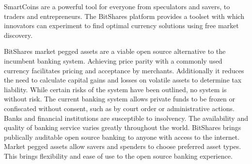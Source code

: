 
SmartCoins are a powerful tool for everyone from speculators and savers, to
traders and entrepreneurs. The BitShares platform provides a toolset with which
innovators can experiment to find optimal currency solutions using free market
discovery.

BitShares market pegged assets are a viable open source alternative to the
incumbent banking system. Achieving price parity with a commonly used currency
facilitates pricing and acceptance by merchants. Additionally it reduces the
need to calculate capital gains and losses on volatile assets to determine tax
liability. While certain risks of the system have been outlined, no system is
without risk. The current banking system allows private funds to be frozen or
confiscated without consent, such as by court order or administrative actions.
Banks and financial institutions are susceptible to insolvency. The
availability and quality of banking service varies greatly throughout the
world. BitShares brings publically auditable open source banking to anyone with
access to the internet. Market pegged assets allow savers and spenders to
choose preferred asset types. This brings flexibility and ease of use to the
open source banking experience.


